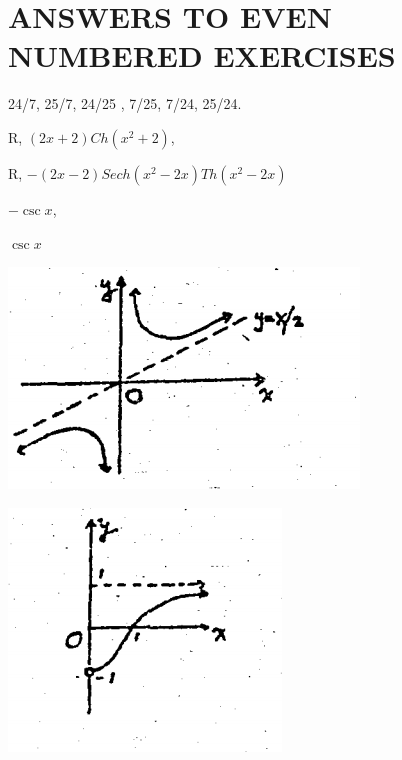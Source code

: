 \documentclass[11pt]{amsbook}
\begin{document}
\section*{ANSWERS TO EVEN NUMBERED EXERCISES}
\begin{hEnumerateArabic}
    \setcounter{enumi}{5}
    \item 24/7, 25/7, 24/25 , 7/25, 7/24, 25/24.
    \setcounter{enumi}{47}
    \item 
        \begin{hEnumerateAlpha}
            \item R, $(2x + 2) Ch(x^2 + 2)$,
            \item R, $-(2x - 2) Sech(x^2 - 2x) Th(x^2 - 2x)$
        \end{hEnumerateAlpha}
    \setcounter{enumi}{51}
    \item 
        \begin{hEnumerateAlpha}
            \begin{multicols}{2}
                \item $-\csc x$,
                \columnbreak
                \item $\csc x$
            \end{multicols}
        \end{hEnumerateAlpha}
    \setcounter{enumi}{53}
    \item
        \begin{hEnumerateAlpha}
            \begin{multicols}{2}
                \item \includegraphics[align=t,scale=0.75]{images/b1p2-423-fig01.png}
                \columnbreak
                \item \includegraphics[align=t,scale=0.75]{images/b1p2-423-fig02.png}

\end{multicols}
\end{hEnumerateAlpha}
\end{hEnumerateArabic}
\end{document}
